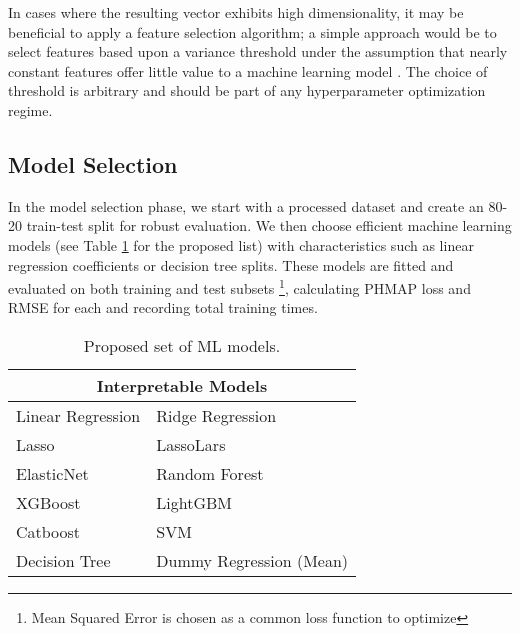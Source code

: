 \documentclass{IEEEtran}
\begin{document}
                In cases where the resulting vector exhibits high dimensionality, it may be beneficial to apply a feature selection algorithm; a simple approach would be to select features based upon a variance threshold under the assumption that nearly constant features offer little value to a machine learning model \cite{li2017feature}. The choice of threshold is arbitrary and should be part of any hyperparameter optimization regime.

        \subsection{Model Selection} \label{sec:model}

            In the model selection phase, we start with a processed dataset and create an 80-20 train-test split for robust evaluation. We then choose efficient machine learning models (see Table \ref{tab:interpretable_models} for the proposed list) with characteristics such as linear regression coefficients or decision tree splits. These models are fitted and evaluated on both training and test subsets \footnote{Mean Squared Error is chosen as a common loss function to optimize}, calculating PHMAP loss and RMSE for each and recording total training times.
            \begin{table}[!htbp]
                \centering
                \caption{Proposed set of ML models.}
                \label{tab:interpretable_models}
                \begin{tabular}{ll}
                    \toprule
                    \multicolumn{2}{c}{Interpretable Models} \\
                    \midrule
                    Linear Regression \cite{scikit-learn} & Ridge Regression \cite{scikit-learn}\\
                    Lasso \cite{scikit-learn} & LassoLars \cite{scikit-learn} \\
                    ElasticNet \cite{scikit-learn} & Random Forest \cite{scikit-learn} \\
                    XGBoost \cite{xgboost} & LightGBM \cite{ke2017lightgbm} \\
                    Catboost \cite{catboost} & SVM \cite{scikit-learn} \\
                    Decision Tree \cite{scikit-learn}& Dummy Regression (Mean) \cite{scikit-learn} \\
                    \bottomrule
                \end{tabular}
            \end{table}
\end{document}
